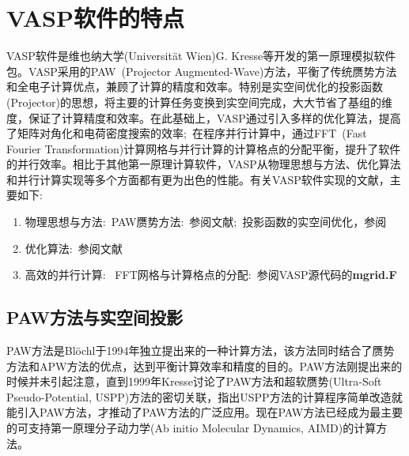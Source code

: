 \documentclass{article}      %
\newcommand{\upcite}[1]{\hspace{0ex}\textsuperscript{\cite{#1}}} %
\begin{document}
\section{\rm{VASP}软件的特点}
\textrm{VASP}软件\upcite{VASP_manual}是维也纳大学(Universit\"at Wien)\textrm{G. Kresse}等开发的第一原理模拟软件包。\textrm{VASP}采用的\textrm{PAW~(Projector Augmented-Wave)}方法\upcite{PRB50-17953_1994,PRB59-1758_1999}，平衡了传统赝势方法和全电子计算优点，兼顾了计算的精度和效率。特别是实空间优化的投影函数\textrm{(Projector)}的思想，将主要的计算任务变换到实空间完成，大大节省了基组的维度，保证了计算精度和效率。在此基础上，\textrm{VASP}通过引入多样的优化算法，提高了矩阵对角化和电荷密度搜索的效率;~在程序并行计算中，通过\textrm{FFT~(Fast Fourier Transformation)}计算网格与并行计算的计算格点的分配平衡，提升了软件的并行效率。相比于其他第一原理计算软件，\textrm{VASP}从物理思想与方法、优化算法和并行计算实现等多个方面都有更为出色的性能。有关\textrm{VASP}软件实现的文献，主要如下:~
\begin{enumerate}
	\item 物理思想与方法:~\textrm{PAW}赝势方法:~参阅文献\cite{PRB50-17953_1994,PRB59-1758_1999};~投影函数的实空间优化，参阅\cite{JPCM6-8245_1994,PRB44-13063_1991,PRB44-8503_1991}
	\item 优化算法:~参阅文献\cite{CMS6-15_1996,PRB54-11169_1996}
	\item 高效的并行计算:~ \textrm{FFT}网格与计算格点的分配:~参阅\textrm{VASP}源代码的\textbf{mgrid.F}
\end{enumerate}

\subsection{\rm{PAW}方法与实空间投影}
\textrm{PAW}方法是\textrm{Bl\"ochl}于1994年独立提出来的一种计算方法\upcite{PRB50-17953_1994}，该方法同时结合了赝势方法和APW方法的优点，达到平衡计算效率和精度的目的。\textrm{PAW}方法刚提出来的时候并未引起注意，直到1999年\textrm{Kresse}讨论了\textrm{PAW}方法和超软赝势\textrm{(Ultra-Soft Pseudo-Potential, USPP)}方法的密切关联，指出\textrm{USPP}方法的计算程序简单改造就能引入\textrm{PAW}方法，才推动了\textrm{PAW}方法的广泛应用。\upcite{PRB59-1758_1999}现在\textrm{PAW}方法已经成为最主要的可支持第一原理分子动力学\textrm{(Ab initio Molecular Dynamics, AIMD)}的计算方法。
\end{document}
